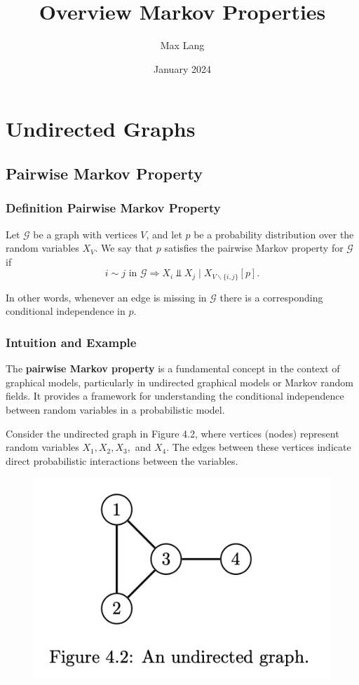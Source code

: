 \documentclass{article}
\title{Overview Markov Properties}
\author{Max Lang}
\date{January 2024}
\begin{document}
\section{Undirected Graphs}
\subsection{Pairwise Markov Property}
\subsubsection{Definition Pairwise Markov Property}
Let $\mathcal{G}$ be a graph with vertices $V$, and let $p$ be a probability distribution over the random variables $X_V$. We say that $p$ satisfies the pairwise Markov property for $\mathcal{G}$ if
$$
i \sim j \text { in } \mathcal{G} \Longrightarrow X_i \Perp X_j \mid X_{V \backslash\{i, j\}}[p] .
$$

In other words, whenever an edge is missing in $\mathcal{G}$ there is a corresponding conditional independence in $p$.

\subsubsection{Intuition and Example}

The \textbf{pairwise Markov property} is a fundamental concept in the context of graphical models, particularly in undirected graphical models or Markov random fields. It provides a framework for understanding the conditional independence between random variables in a probabilistic model.

Consider the undirected graph in Figure 4.2, where vertices (nodes) represent random variables $X_1, X_2, X_3,$ and $X_4$. The edges between these vertices indicate direct probabilistic interactions between the variables.

\begin{figure}[h]
    \centering
    \includegraphics{overviews/graphical-models/figures/figure_4.2.png}
    \label{fig:graph}
\end{figure}
\end{document}
